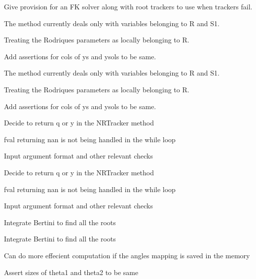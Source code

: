\begin{DoxyRefList}
\label{todo__todo000008}%
%
Give provision for an FK solver along with root trackers to use when trackers fail.  
\item[Member \mbox{\hyperlink{classRootTracker_ae13e787a2ef083592f5c8d07ac4d08bc}{Root\+Tracker\+::NNTracker}} (Vector\+Xd ys, Matrix\+Xd ysols, int index)]\label{todo__todo000004}%
%
The method currently deals only with variables belonging to R and S1. 

Treating the Rodriques parameters as locally belonging to R. 

Add assertions for cols of ys and ysols to be same. 

\label{todo__todo000011}%
%
The method currently deals only with variables belonging to R and S1. 

Treating the Rodriques parameters as locally belonging to R. 

Add assertions for cols of ys and ysols to be same.  
\item[Member \mbox{\hyperlink{classRootTracker_a6bb3dcb73ea58ac44ab15d7803de3d5a}{Root\+Tracker\+::NRTracker}} (Vector\+Xd x, Vector\+Xd y, std\+::function$<$ Vector\+Xd(\+Vector\+Xd)$>$ f, std\+::function$<$ Matrix\+Xd(\+Vector\+Xd)$>$ Jfy, double eps=pow(10, -\/10))]\label{todo__todo000002}%
%
Decide to return q or y in the NRTracker method 

fval returning nan is not being handled in the while loop 

Input argument format and other relevant checks 

\label{todo__todo000009}%
%
Decide to return q or y in the NRTracker method 

fval returning nan is not being handled in the while loop 

Input argument format and other relevant checks  
\item[Member \mbox{\hyperlink{classRootTracker_ada1cf0e1ae31392f075fe5f92972f17f}{Root\+Tracker\+::Singularity\+Event\+Identifier}} (Vector\+Xd ys, Matrix\+Xd ysols, int index, double eps=pow(10, -\/2))]\label{todo__todo000005}%
%
Integrate Bertini to find all the roots 

\label{todo__todo000012}%
%
Integrate Bertini to find all the roots  
\item[Member \mbox{\hyperlink{utils_8hh_aa55cfeada673b3ce1ce1e504925e117c}{s1\+Dist}} (Vector\+Xd theta1, Vector\+Xd theta2)]\label{todo__todo000014}%
%
Can do more effecient computation if the angles mapping is saved in the memory 

Assert sizes of theta1 and theta2 to be same 
\end{DoxyRefList}